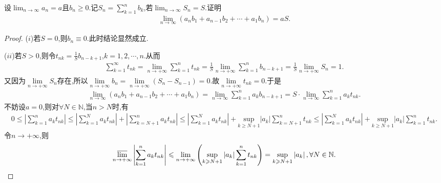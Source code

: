 \documentclass[../../main.tex]{subfiles}%
\begin{document}
\begin{proposition}\label{proposition:命题:3.422164}
设\(\lim_{n \to \infty} a_n = a\)且\(b_n \geqslant 0\).记\(S_n = \sum\limits_{k = 1}^{n} b_k\),若\(\lim_{n \to \infty} S_n = S\).证明
\begin{align*}
\lim_{n \to \infty} (a_n b_1 + a_{n - 1} b_2 + \cdots + a_1 b_n) = aS.
\end{align*}
\end{proposition}
\begin{proof}

($i$)若$S=0$,则$b_n\equiv0$.此时结论显然成立.

($ii$)若$S>0$,则令\(t_{nk} = \frac{1}{S} b_{n - k + 1}\),\(k = 1,2,\cdots,n\).从而
\begin{align*}
\sum\limits_{k=1}^{\infty}{t_{nk}}=\underset{n\rightarrow +\infty}{\lim}\sum\limits_{k=1}^n{t_{nk}}=\frac{1}{S}\underset{n\rightarrow +\infty}{\lim}\sum\limits_{k=1}^n{b_{n-k+1}}=\frac{1}{S}\underset{n\rightarrow +\infty}{\lim}S_n=1.
\end{align*}
又因为$\underset{n\rightarrow +\infty}{\lim}S_n$存在,所以$\underset{n\rightarrow +\infty}{\lim}b_n=\underset{n\rightarrow +\infty}{\lim}\left( S_n-S_{n-1} \right) =0
$.故$\underset{n\rightarrow +\infty}{\lim}t_{nk}=0$.于是
\begin{align*}
\lim_{n\rightarrow \infty} \left( a_nb_1+a_{n-1}b_2+\cdots +a_1b_n \right) =\lim_{n\rightarrow \infty} \sum\limits_{k=1}^n{a_kb_{n-k+1}}=S\cdot \lim_{n\rightarrow \infty} \sum\limits_{k=1}^n{a_kt_{nk}}.
\end{align*}
不妨设$a=0$,则对$\forall N\in\mathbb{N}$,当$n>N$时,有
\begin{align*}
0\leqslant \left| \sum\limits_{k=1}^n{a_kt_{nk}} \right|\leqslant \left| \sum\limits_{k=1}^N{a_kt_{nk}} \right|+\left| \sum\limits_{k=N+1}^n{a_kt_{nk}} \right|\leqslant \left| \sum\limits_{k=1}^N{a_kt_{nk}} \right|+\underset{k\geqslant N+1}{\mathrm{sup}}\left| a_k \right|\sum\limits_{k=N+1}^n{t_{nk}}\leqslant \left| \sum\limits_{k=1}^N{a_kt_{nk}} \right|+\underset{k\geqslant N+1}{\mathrm{sup}}\left| a_k \right|\sum\limits_{k=1}^n{t_{nk}}.
\end{align*}
令$n\to+\infty$,则
\begin{align*}
\underset{n\rightarrow +\infty}{{\varlimsup }}\left| \sum\limits_{k=1}^n{a_kt_{nk}} \right|\leqslant \underset{n\rightarrow +\infty}{\lim}\left( \underset{k\geqslant N+1}{\mathrm{sup}}\left| a_k \right|\sum\limits_{k=1}^n{t_{nk}} \right) =\underset{k\geqslant N+1}{\mathrm{sup}}\left| a_k \right|,\forall N\in \mathbb{N} .

\end{align*}
\end{proof}
\end{document}
